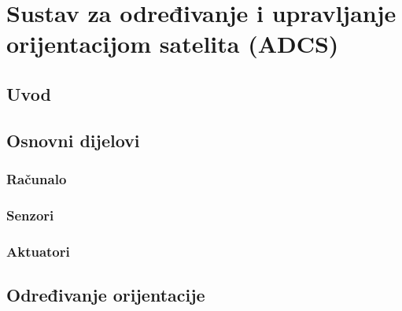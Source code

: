 \documentclass[times, utf8, diplomski, numeric]{templates/template}
\begin{document}
\chapter{Sustav za određivanje i upravljanje orijentacijom satelita (ADCS)}{
    \section{Uvod}{
    }

    \section{Osnovni dijelovi}{
        \subsection{Računalo}{
        }

        \subsection{Senzori}{
        }

        \subsection{Aktuatori}{
        }
    }

    \section{Određivanje orijentacije}{
}}
\end{document}
